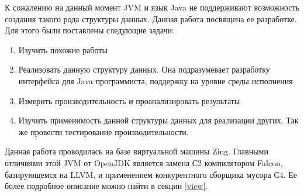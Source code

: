 К сожалению на данный момент JVM и язык Java не поддерживают возможность создания такого рода структуры данных. Данная работа посвящена ее разработке. Для этого были поставлены следующие задачи: 
\begin{enumerate}
	\item Изучить похожие работы
	\item Реализовать данную структуру данных. Она подразумевает разработку интерфейса для Java программиста, поддержку на уровне среды исполнения
	\item Измерить производительность и проанализировать результаты
	\item Изучить применимость данной структуры данных для реализации других. Так же провести тестирование производительности.
\end{enumerate}
Данная работа проводилась на базе виртуальной машины Zing. Главными отличиями этой JVM от OpenJDK является замена С2 компилятором Falcon, базирующемся на LLVM, и применением конкурентного сборщика мусора С4\cite{C4collector}. Ее более подробное описание можно найти в секции \ref{view}.
\clearpage

